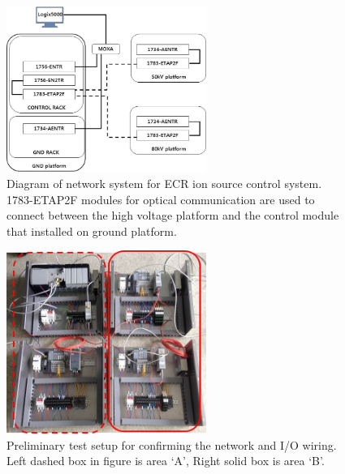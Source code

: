 \documentclass[a4paper,
              ]{jacow}
\begin{document}
\begin{figure}[!htb]
	\centering
	\includegraphics*[width=65mm]{MOPGF119f1}
	\caption{Diagram of network system for ECR ion source control system. 1783-ETAP2F modules for optical communication are used to connect between the high voltage platform and the control module that installed on ground platform.}
\end{figure}


\begin{figure}[!htb]
	\centering
	\includegraphics*[width=65mm]{MOPGF119f2}
	\caption{Preliminary test setup for confirming the network and I/O wiring. Left dashed box in figure is area ‘A’, Right solid box is area ‘B’.}
\end{figure}
\end{document}
